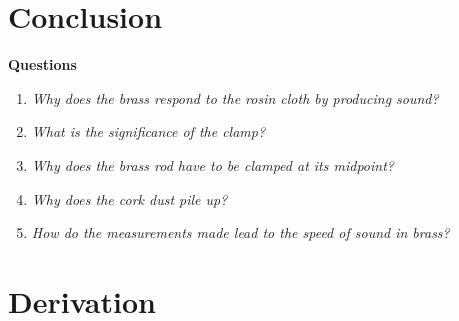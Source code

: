 \documentclass[twocolumn,english]{IEEEtran}
\theoremstyle{plain}
\theoremstyle{plain}
\begin{document}
\section{Conclusion}
\textbf{Questions}
\begin{enumerate}
 \item \textit{Why does the brass respond to the rosin cloth by producing sound?}
 \item \textit{What is the significance of the clamp?}
 \item \textit{Why does the brass rod have to be clamped at its midpoint?}
 \item \textit{Why does the cork dust pile up?}
 \item \textit{How do the measurements made lead to the speed of sound in brass?}
\end{enumerate}

\appendices{}

\section{Derivation}\label{append:deriv}


%
%
\end{document}
